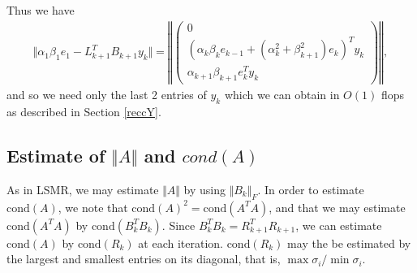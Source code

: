 \documentclass[11pt]{article}
\begin{document}
Thus we have
\begin{eqnarray*}
\Vert \alpha_1 \beta_1 e_1 - L^T_{k+1} B_{k+1} y_k \Vert = \left\Vert \begin{pmatrix}
0 \\ (\alpha_k \beta_k e_{k-1} + (\alpha^2_k + \beta^2_{k+1}) e_k)^T y_k \\ \alpha_{k+1} \beta_{k+1} e^T_{k} y_k
\end{pmatrix} \right\Vert,
\end{eqnarray*}
and so we need only the last 2 entries of $y_k$ which we can obtain in $O(1)$ flops as described in Section \ref{reccY}.

\subsection{Estimate of $\Vert A \Vert$ and $cond(A)$}
As in LSMR, we may estimate $\Vert A \Vert$ by using $\Vert B_k \Vert_F$. In order to estimate $\text{cond} (A)$, we note that $\text{cond}(A)^2 = \text{cond}(A^T A)$, and that we may estimate $\text{cond}(A^T A)$ by $\text{cond}(B_k^T B_k)$. Since $B_k^T B_k = R_{k+1}^T R_{k+1}$, we can estimate $\text{cond}(A)$ by $\text{cond}(R_k)$ at each iteration. $\text{cond}(R_k)$ may the be estimated by the largest and smallest entries on its diagonal, that is, $\max \sigma_i / \min \sigma_i$.
\end{document}
